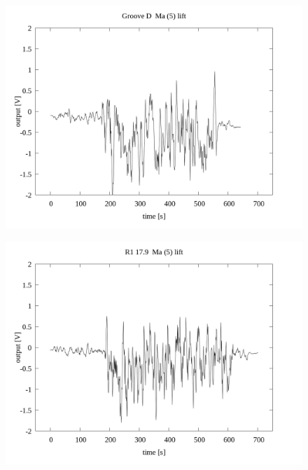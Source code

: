\documentclass[a4paper]{jsarticle}
\begin{document}
\begin{figure}[htbp]
    \footnotesize
    \begin{center}
        \includegraphics[width=140mm]{../../../../33_result/210806/moving_average/5/lift/01/Groove_D_ma(5)_lift_01.png}
    \end{center}
\end{figure}

\begin{figure}[htbp]
    \footnotesize
    \begin{center}
        \includegraphics[width=140mm]{../../../../33_result/210806/moving_average/5/lift/01/R1_17.9_ma(5)_lift_01.png}
    \end{center}
\end{figure}
\end{document}
